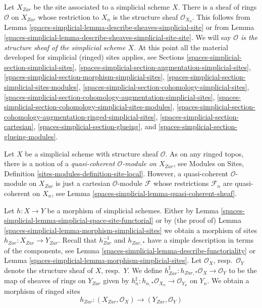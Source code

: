 \medskip\noindent
Let $X_{Zar}$ be the site associated to a simplicial scheme $X$.
There is a sheaf of rings $\mathcal{O}$ on $X_{Zar}$ whose restriction
to $X_n$ is the structure sheaf $\mathcal{O}_{X_n}$. This follows
from Lemma \ref{spaces-simplicial-lemma-describe-sheaves-simplicial-site} or from
Lemma \ref{spaces-simplicial-lemma-describe-sheaves-simplicial-site-site}. We will say
{\it $\mathcal{O}$ is the structure sheaf of the simplicial scheme $X$}.
At this point all the material developed for simplicial (ringed) sites
applies, see Sections \ref{spaces-simplicial-section-simplicial-sites},
\ref{spaces-simplicial-section-augmentation-simplicial-sites},
\ref{spaces-simplicial-section-morphism-simplicial-sites},
\ref{spaces-simplicial-section-simplicial-sites-modules},
\ref{spaces-simplicial-section-cohomology-simplicial-sites},
\ref{spaces-simplicial-section-cohomology-augmentation-simplicial-sites},
\ref{spaces-simplicial-section-cohomology-simplicial-sites-modules},
\ref{spaces-simplicial-section-cohomology-augmentation-ringed-simplicial-sites},
\ref{spaces-simplicial-section-cartesian},
\ref{spaces-simplicial-section-glueing}, and
\ref{spaces-simplicial-section-glueing-modules}.

\medskip\noindent
Let $X$ be a simplicial scheme with structure sheaf $\mathcal{O}$.
As on any ringed topos, there is a notion
of a {\it quasi-coherent $\mathcal{O}$-module on $X_{Zar}$}, see
Modules on Sites, Definition \ref{sites-modules-definition-site-local}.
However, a quasi-coherent $\mathcal{O}$-module on $X_{Zar}$ is
just a cartesian $\mathcal{O}$-module $\mathcal{F}$ whose restrictions
$\mathcal{F}_n$ are quasi-coherent on $X_n$, see
Lemma \ref{spaces-simplicial-lemma-quasi-coherent-sheaf}.

\medskip\noindent
Let $h : X \to Y$ be a morphism of simplicial schemes. Either by
Lemma \ref{spaces-simplicial-lemma-simplicial-space-site-functorial} or by
(the proof of) Lemma \ref{spaces-simplicial-lemma-morphism-simplicial-sites}
we obtain a morphism of sites $h_{Zar} : X_{Zar} \to Y_{Zar}$.
Recall that $h_{Zar}^{-1}$ and $h_{Zar, *}$ have a simple
description in terms of the components, see
Lemma \ref{spaces-simplicial-lemma-describe-functoriality} or
Lemma \ref{spaces-simplicial-lemma-morphism-simplicial-sites}.
Let $\mathcal{O}_X$, resp.\ $\mathcal{O}_Y$ denote the structure
sheaf of $X$, resp.\ $Y$. We define
$h_{Zar}^\sharp : h_{Zar, *}\mathcal{O}_X \to \mathcal{O}_Y$
to be the map of sheaves of rings on $Y_{Zar}$ given by
$h_n^\sharp : h_{n, *}\mathcal{O}_{X_n} \to \mathcal{O}_{Y_n}$ on $Y_n$.
We obtain a morphism of ringed sites
$$
h_{Zar} : (X_{Zar}, \mathcal{O}_X) \longrightarrow (Y_{Zar}, \mathcal{O}_Y)
$$

